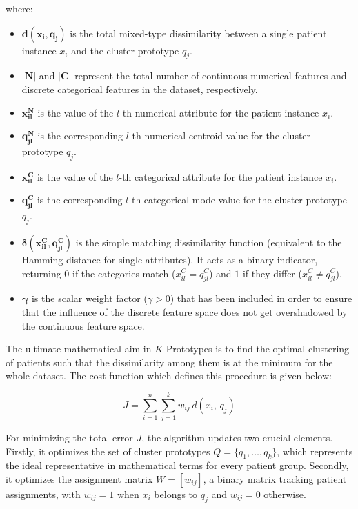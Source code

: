 where:
\begin{itemize}
    \item $\boldsymbol{d(x_i, q_j)}$ is the total mixed-type dissimilarity between a single patient instance $x_i$ and the cluster prototype $q_j$.
    \item $\boldsymbol{|N|}$ and $\boldsymbol{|C|}$ represent the total number of continuous numerical features and discrete categorical features in the dataset, respectively.
    \item $\boldsymbol{x_{il}^N}$ is the value of the $l$-th numerical attribute for the patient instance $x_i$.
    \item $\boldsymbol{q_{jl}^N}$ is the corresponding $l$-th numerical centroid value for the cluster prototype $q_j$.
    \item $\boldsymbol{x_{il}^C}$ is the value of the $l$-th categorical attribute for the patient instance $x_i$.
    \item $\boldsymbol{q_{jl}^C}$ is the corresponding $l$-th categorical mode value for the cluster prototype $q_j$.
    \item $\boldsymbol{\delta(x_{il}^C, q_{jl}^C)}$ is the simple matching dissimilarity function (equivalent to the Hamming distance for single attributes). It acts as a binary indicator, returning $0$ if the categories match ($x_{il}^C = q_{jl}^C$) and $1$ if they differ ($x_{il}^C \neq q_{jl}^C$).
    \item $\boldsymbol{\gamma}$ is the scalar weight factor ($\gamma > 0$) that has been included in order to ensure that the influence of the discrete feature space does not get overshadowed by the continuous feature space.
\end{itemize}

\clearpage

The ultimate mathematical aim in $K$-Prototypes is to find the optimal clustering of patients such that the dissimilarity among them is at the minimum for the whole dataset. The cost function which defines this procedure is given below:

\begin{equation}
    J = \sum_{i=1}^{n} \sum_{j=1}^{k} w_{ij}\, d(x_i,\, q_j)
    \label{eq:kproto_obj}
\end{equation}

For minimizing the total error $J$, the algorithm updates two crucial elements. Firstly, it optimizes the set of cluster prototypes $Q = \{q_1, \ldots, q_k\}$, which represents the ideal representative in mathematical terms for every patient group. Secondly, it optimizes the assignment matrix $W = [w_{ij}]$, a binary matrix tracking patient assignments, with $w_{ij}=1$ when $x_i$ belongs to $q_j$ and $w_{ij}=0$ otherwise.

